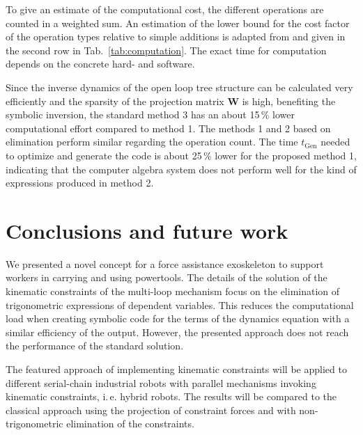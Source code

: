 \documentclass[letterpaper, 10 pt, conference]{ieeeconf}  %
\newcommand{\bm}[1]{\boldsymbol{#1}}
\begin{document}
To give an estimate of the computational cost, the different operations are counted in a weighted sum. An estimation of the lower bound for the cost factor of the operation types relative to simple additions is adapted from \cite{Atkinson2014, Hindriksen2012} and given in the second row in Tab.\, \ref{tab:computation}.
The exact time for computation depends on the concrete hard- and software.

Since the inverse dynamics of the open loop tree structure can be calculated very efficiently and the sparsity of the projection matrix $\bm{W}$ is high, benefiting the symbolic inversion, the standard method 3 has an about 15\,\% lower computational effort compared to method 1.
The methods 1 and 2 based on elimination perform similar regarding the operation count.
The time $t_\mathrm{Gen}$ needed to optimize and generate the code is about 25\,\% lower for the proposed method 1, indicating that the computer algebra system does not perform well for the kind of expressions produced in method 2.


\section{Conclusions and future work}
\label{sec:conclusion}

We presented a novel concept for a force assistance exoskeleton to support workers in carrying and using powertools.
The details of the solution of the kinematic constraints of the multi-loop mechanism focus on the elimination of trigonometric expressions of dependent variables.
This reduces the computational load when creating symbolic code for the terms of the dynamics equation with a similar efficiency of the output.
However, the presented approach does not reach the performance of the standard solution.

The featured approach of implementing kinematic constraints will be applied to different serial-chain industrial robots with parallel mechanisms invoking kinematic constraints, i.\,e. hybrid robots. 
The results will be compared to the classical approach using the projection of constraint forces and with non-trigonometric elimination of the constraints.

\end{document}
